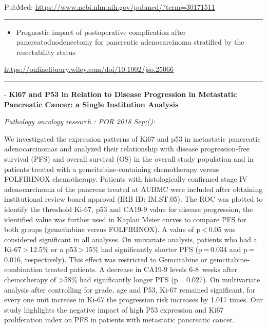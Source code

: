 \documentclass[]{article}
\providecommand{\tightlist}{%
  \setlength{\itemsep}{0pt}\setlength{\parskip}{0pt}}
\begin{document}
PubMed: \url{https://www.ncbi.nlm.nih.gov/pubmed/?term=30171511}

{}

{}

\begin{center}\rule{0.5\linewidth}{\linethickness}\end{center}

\begin{itemize}
\tightlist
\item
  Prognostic impact of postoperative complication after
  pancreatoduodenectomy for pancreatic adenocarcinoma stratified by the
  resectability status
\end{itemize}

\url{https://onlinelibrary.wiley.com/doi/10.1002/jso.25066}

\begin{center}\rule{0.5\linewidth}{\linethickness}\end{center}

 - \textbf{Ki67 and P53 in Relation to Disease Progression in Metastatic
Pancreatic Cancer: a Single Institution Analysis}

\emph{Pathology oncology research : POR 2018 Sep;():}

We investigated the expression patterns of Ki67 and p53 in metastatic
pancreatic adenocarcinomas and analyzed their relationship with disease
progression-free survival (PFS) and overall survival (OS) in the overall
study population and in patients treated with a gemcitabine-containing
chemotherapy versus FOLFIRINOX chemotherapy. Patients with
histologically confirmed stage IV adenocarcinoma of the pancreas treated
at AUBMC were included after obtaining institutional review board
approval (IRB ID: IM.ST.05). The ROC was plotted to identify the
threshold Ki-67, p53 and CA19-9 value for disease progression, the
identified value was further used in Kaplan Meier curves to compare PFS
for both groups (gemcitabine versus FOLFIRINOX). A value of
p \textless{} 0.05 was considered significant in all analyses. On
univariate analysis, patients who had a Ki-67 \textgreater{} 12.5\% or a
p53 \textgreater{} 15\% had significantly shorter PFS (p = 0.034 and
p = 0.016, respectively). This effect was restricted to Gemcitabine or
gemcitabine-combination treated patients. A decrease in CA19-9 levels
6-8~weeks after chemotherapy of \textgreater{}58\% had significantly
longer PFS (p = 0.027). On multivariate analysis after controlling for
grade, age and P53, Ki-67 remained significant, for every one unit
increase in Ki-67 the progression risk increases by 1.017 times. Our
study highlights the negative impact of high P53 expression and Ki67
proliferation index on PFS in patients with metastatic pancreatic
cancer.
\end{document}
